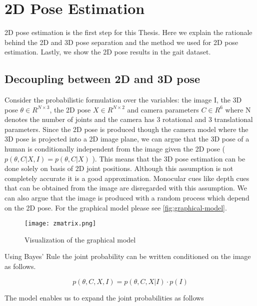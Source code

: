 
\chapter{2D Pose Estimation}\label{chapter:2dpose}

2D pose estimation is the first step for this Thesis. Here we explain the rationale behind the 2D and 3D pose separation and the method we used for 2D pose estimation. Lastly, we show the 2D pose results in the gait dataset. 

\section{Decoupling between 2D and 3D pose}

Consider the probabilistic formulation over the variables: the image I, the 3D pose $ \theta \in R^{N\times3} $, the 2D pose $X \in R^{N\times2}$ and camera parameters $ C \in R^{6} $ where N denotes the number of joints and the camera has 3 rotational and 3 translational parameters. Since the 2D pose is produced though the camera model where the 3D pose is projected into a 2D image plane, we can argue that the 3D pose of a human is conditionally independent from the image given the 2D pose ( $p(\theta,C|X,I) = p(\theta,C|X)$ ). This means that the 3D pose estimation can be done solely on basis of 2D joint positions. Although this assumption is not completely accurate it is a good approximation. Monocular cues like depth cues that can be obtained from the image are disregarded with this assumption. We can also argue that the image is produced with a random process which depend on the 2D pose. For the graphical model please see \autoref{fig:graphical-model}.

\begin{figure}[htpb]
    \texttt{[image: zmatrix.png]}
    \caption{Visualization of the graphical model}
    \label{fig:graphical-model}
\end{figure}

Using Bayes' Rule the joint probability can be written conditioned on the image as follows.

\begin{equation}
    p(\theta,C,X,I) = p(\theta,C,X|I) \cdot p(I)
\end{equation}

The model enables us to expand the joint probabilities as follows

